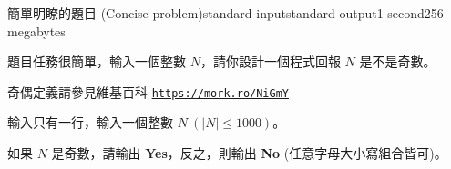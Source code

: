 \begin{problem}{簡單明瞭的題目 (Concise problem)}{standard input}{standard output}{1 second}{256 megabytes}

\providecommand{\url}[1]{\underline{\texttt{#1}}}

題目任務很簡單，輸入一個整數 $N$，請你設計一個程式回報 $N$ 是不是奇數。

奇偶定義請參見維基百科 \url{https://mork.ro/NiGmY}

\InputFile
輸入只有一行，輸入一個整數 $N \ ( |N| \le 1000 )$。

\OutputFile
如果 $N$ 是奇數，請輸出 \textbf{Yes}，反之，則輸出 \textbf{No} (任意字母大小寫組合皆可)。

\Examples

\begin{example}
%
%
%
\end{example}

\end{problem}

